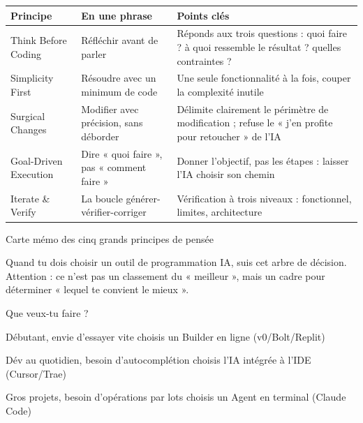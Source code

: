 


\begin{center}
\begin{tabularx}{\linewidth}{|X|X|X|}
\hline
\textbf{Principe} & \textbf{En une phrase} & \textbf{Points clés} \tabularnewline
\hline
Think Before Coding & Réfléchir avant de parler & Réponds aux trois questions : quoi faire ? à quoi ressemble le résultat ? quelles contraintes ? \tabularnewline
Simplicity First & Résoudre avec un minimum de code & Une seule fonctionnalité à la fois, couper la complexité inutile \tabularnewline
Surgical Changes & Modifier avec précision, sans déborder & Délimite clairement le périmètre de modification ; refuse le « j'en profite pour retoucher » de l'IA \tabularnewline
Goal-Driven Execution & Dire « quoi faire », pas « comment faire » & Donner l'objectif, pas les étapes : laisser l'IA choisir son chemin \tabularnewline
Iterate \& Verify & La boucle générer-vérifier-corriger & Vérification à trois niveaux : fonctionnel, limites, architecture \tabularnewline
\hline
\end{tabularx}
\end{center}

\begin{center}\small\color{gray}Carte mémo des cinq grands principes de pensée\end{center}


Quand tu dois choisir un outil de programmation IA, suis cet arbre de décision. Attention : ce n'est pas un classement du « meilleur », mais un cadre pour déterminer « lequel te convient le mieux ».

Que veux-tu faire ?

Débutant, envie d'essayer vite choisis un Builder en ligne (v0/Bolt/Replit)

Dév au quotidien, besoin d'autocomplétion choisis l'IA intégrée à l'IDE (Cursor/Trae)

Gros projets, besoin d'opérations par lots choisis un Agent en terminal (Claude Code)

